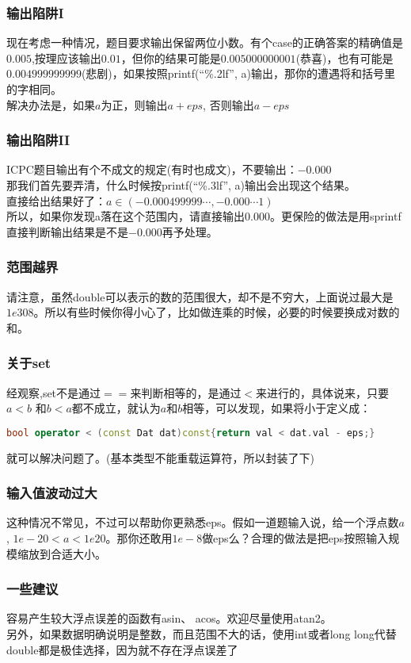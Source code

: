 	\subsubsection{输出陷阱I}
	现在考虑一种情况，题目要求输出保留两位小数。有个case的正确答案的精确值是$0.005$,按理应该输出$0.01$，但你的结果可能是$0.005000000001$(恭喜)，也有可能是$0.004999999999$(悲剧)，如果按照\textsf{printf(“\%.2lf”, a)}输出，那你的遭遇将和括号里的字相同。\\
	解决办法是，如果$a$为正，则输出$a+eps$, 否则输出$a-eps$\\
	
	\subsubsection{输出陷阱II}
	ICPC题目输出有个不成文的规定(有时也成文)，不要输出：$-0.000$\\
	那我们首先要弄清，什么时候按\textsf{printf(“\%.3lf”, a)}输出会出现这个结果。\\
	直接给出结果好了：$a\in (-0.000499999\cdots , -0.000\cdots 1)$\\
	所以，如果你发现a落在这个范围内，请直接输出$0.000$。更保险的做法是用\textsf{sprintf}直接判断输出结果是不是$-0.000$再予处理。\\

	\subsubsection{范围越界}
	请注意，虽然double可以表示的数的范围很大，却不是不穷大，上面说过最大是$1e308$。所以有些时候你得小心了，比如做连乘的时候，必要的时候要换成对数的和。\\
	
	\subsubsection{关于set}
	经观察,set不是通过$==$来判断相等的，是通过$<$来进行的，具体说来，只要$a<b$ 和$b<a$都不成立，就认为$a$和$b$相等，可以发现，如果将小于定义成：
	\begin{lstlisting}[language=c++]
bool operator < (const Dat dat)const{return val < dat.val - eps;}
	\end{lstlisting}
	就可以解决问题了。(基本类型不能重载运算符，所以封装了下)\\
	
	\subsubsection{输入值波动过大}
	这种情况不常见，不过可以帮助你更熟悉eps。假如一道题输入说，给一个浮点数$a$, $1e-20 < a < 1e20$。那你还敢用$1e-8$做eps么？合理的做法是把eps按照输入规模缩放到合适大小。\\
	
	\subsubsection{一些建议}
	容易产生较大浮点误差的函数有asin、 acos。欢迎尽量使用atan2。\\
	另外，如果数据明确说明是整数，而且范围不大的话，使用int或者long long代替double都是极佳选择，因为就不存在浮点误差了\\